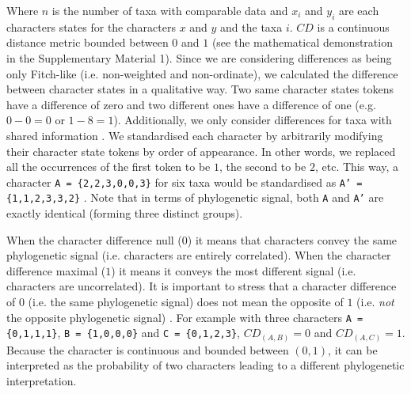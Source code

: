 \documentclass[12pt,letterpaper]{article}
\begin{document}
\noindent Where $n$ is the number of taxa with comparable data and $x_i$ and $y_i$ are each characters states for the characters $x$ and $y$ and the taxa $i$.
$CD$ is a continuous distance metric bounded between $0$ and $1$ (see the mathematical demonstration in the Supplementary Material 1).
Since we are considering differences as being only Fitch-like (i.e. non-weighted and non-ordinate), we calculated the difference between character states in a qualitative way.
Two same character states tokens have a difference of zero and two different ones have a difference of one (e.g. $0 - 0 = 0$ or $1 - 8 = 1$).
Additionally, we only consider differences for taxa with shared information \citep[i.e. a Gower distance;][]{GowerDist}.
We standardised each character by arbitrarily modifying their character state tokens by order of appearance.
In other words, we replaced all the occurrences of the first token to be $1$, the second to be $2$, etc.
This way, a character \texttt{A = \{2,2,3,0,0,3\}} for six taxa would be standardised as \texttt{A' = \{1,1,2,3,3,2\}} \citep[following the \textit{xyz} notation in][p.13]{felsenstein2004inferring}.
Note that in terms of phylogenetic signal, both \texttt{A} and \texttt{A'} are exactly identical (forming three distinct groups).

When the character difference null ($0$) it means that characters convey the same phylogenetic signal (i.e. characters are entirely correlated).
When the character difference maximal ($1$) it means it conveys the most different signal (i.e. characters are uncorrelated).
It is important to stress that a character difference of $0$ (i.e. the same phylogenetic signal) does not mean the opposite of $1$ (i.e. \textit{not} the opposite phylogenetic signal) .
For example with three characters \texttt{A = \{0,1,1,1\}}, \texttt{B = \{1,0,0,0\}} and \texttt{C = \{0,1,2,3\}}, $CD_{(A,B)} = 0$ and $CD_{(A,C)} = 1$.
Because the character is continuous and bounded between $(0,1)$, it can be interpreted as the probability of two characters leading to a different phylogenetic interpretation.
\end{document}
